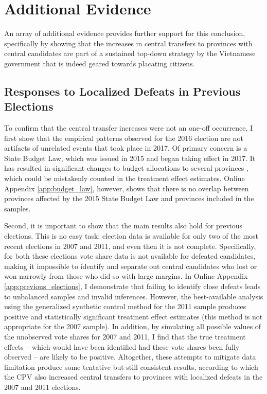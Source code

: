 \documentclass[12pt]{article}
\newcommand{\1}{\mathbbm{1}}
\begin{document}
\section*{Additional Evidence}
\label{sec:additional}

An array of additional evidence provides further support for this conclusion, specifically by showing that the increases in central transfers to provinces with central candidates are part of a sustained top-down strategy by the Vietnamese government that is indeed geared towards placating citizens.

\subsection*{Responses to Localized Defeats in Previous Elections}

To confirm that the central transfer increases were not an one-off occurrence, I first show that the empirical patterns observed for the 2016 election are not artifacts of unrelated events that took place in 2017. Of primary concern is a State Budget Law, which  was issued in 2015 and began taking effect in 2017. It has resulted in significant changes to budget allocations to several provinces \citep{BaoViet2016}, which could be mistakenly counted in the treatment effect estimates. Online Appendix \ref{app:budget_law}, however, shows that there is no overlap between provinces affected by the 2015 State Budget Law and provinces included in the samples.

Second, it is important to show that the main results also hold for previous elections. This is no easy task: election data is available for only two of the most recent elections in 2007 and 2011, and even then it is not complete. Specifically, for both these elections vote share data is not available for defeated candidates, making it impossible to identify and separate out central candidates who lost or won narrowly from those who did so with large margins. In Online Appendix \ref{app:previous_elections}, I demonstrate that failing to identify close defeats leads to unbalanced samples and invalid inferences. However, the best-available analysis using the generalized synthetic control method for the 2011 sample produces positive and statistically significant treatment effect estimates (this method is not appropriate for the 2007 sample). In addition, by simulating all possible values of the unobserved vote shares for 2007 and 2011, I find that the true treatment effects -- which would have been identified had these vote shares been fully observed -- are likely to be positive. Altogether, these attempts to mitigate data limitation produce some tentative but still consistent results, according to which the CPV also increased central transfers to provinces with localized defeats in the 2007 and 2011 elections.
\end{document}
